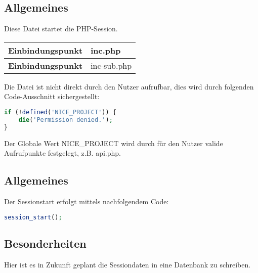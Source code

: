 \subsection{Allgemeines} Diese Datei startet die PHP-Session.
\begin{table}[H]
	\begin{tabular}{|c|p{11cm}|}
		\hline
		\textbf{Einbindungspunkt} & inc.php \\ \hline
		\textbf{Einbindungspunkt} & inc-sub.php \\ \hline
	\end{tabular}
\end{table}
Die Datei ist nicht direkt durch den Nutzer aufrufbar, dies wird durch folgenden Code-Ausschnitt sichergestellt:
\begin{lstlisting}[language=php]
if (!defined('NICE_PROJECT')) {
	die('Permission denied.');
}
\end{lstlisting}
Der Globale Wert {\glqq NICE\_PROJECT\grqq} wird durch für den Nutzer valide Aufrufpunkte festgelegt, z.B. {\glqq api.php\grqq}.
\newpage
\subsection{Allgemeines}
Der Sessionstart erfolgt mittels nachfolgendem Code:
\begin{lstlisting}[language=php]
session_start();
\end{lstlisting}
\subsection{Besonderheiten}
Hier ist es in Zukunft geplant die Sessiondaten in eine Datenbank zu schreiben.